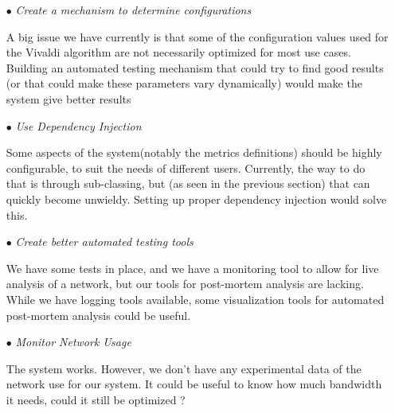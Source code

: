 \documentclass[11pt,a4paper]{article}
\begin{document}
 \begin{itemize}
 	\item[$\bullet$]\emph{Create a mechanism to determine configurations }
 	
	A big issue we have currently is that some of the configuration values used for the Vivaldi algorithm are not necessarily optimized for most use cases. Building an automated testing mechanism that could try to find good results (or that could make these parameters vary dynamically) would make the system give better results
	
	\item[$\bullet$] \emph{Use Dependency Injection}
		
	Some aspects of the system(notably the metrics definitions) should be highly configurable, to suit the needs of different users. Currently, the way to do that is through sub-classing, but (as seen in the previous section) that can quickly become unwieldy. Setting up proper dependency injection would solve this.
	
	\item[$\bullet$] \emph{Create better automated testing tools}
	
	We have some tests in place, and we have a monitoring tool to allow for live analysis of a network, but our tools for post-mortem analysis are lacking. While we have logging tools available, some visualization tools for automated post-mortem analysis could be useful.

	\item[$\bullet$] \emph{Monitor Network Usage}
	
	The system works. However, we don't have any experimental data of the network use for our system. It could be useful to know how much bandwidth it needs, could it still be optimized ?  
	 
 \end{itemize}
\end{document}
